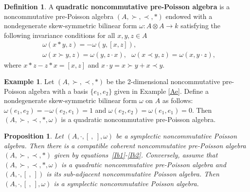 \documentclass[12pt]{amsart}
\newtheorem{pro}[thm]{Proposition}
\theoremstyle{definition}
\newtheorem{defi}[thm]{Definition}
\newtheorem{ex}[thm]{Example}
\begin{document}
\begin{defi} A {\bf quadratic noncommutative pre-Poisson algebra} is a noncommutative pre-Poisson algebra $(A,\succ,\prec, \ast)$
endowed with a nondegenerate 
skew-symmetric bilinear form $\omega:A\otimes A\longrightarrow k$ satisfying the following invariance conditions for all
 $x,y,z\in A $
  \begin{align}&\label{Ib1}
    \omega(x\ast y,z)=-\omega(y,[x,z]),\\&
    \label{Ib2} \omega(x\succ y,z)=\omega(y,z\cdot x) ,\ \ \ 
    \omega(x\prec y,z)=\omega(x,y\cdot z),
  \end{align}
where $x\ast z-z\ast x=[x,z]$ and $x\cdot y=x\succ y+x\prec y$.\end{defi}

\begin{ex} Let $(A,\succ,\prec, \ast)$ be the 2-dimensional noncommutative pre-Poisson algebra with a basis 
$\{ e_1,e_2\}$ given in Example \ref{Ae}.
Define a nondegenerate 
skew-symmetric bilinear form $\omega$ on $A$ as follows:
$\omega(e_1,e_2)=-\omega(e_2,e_1)=1 $ and $\omega(e_2,e_2)=\omega(e_1,e_1)=0 $.
Then $(A,\succ,\prec, \ast,\omega)$ is a quadratic noncommutative pre-Poisson algebra.
\end{ex}

\begin{pro}\label{Ps1} Let  $(A, \cdot, [ \ , \ ],\omega)$ be a symplectic noncommutative Poisson algebra.
Then there is a compatible coherent
noncommutative pre-Poisson algebra $(A,\succ,\prec, \ast)$ given by equations~\eqref{Ib1}-\eqref{Ib2}.
Conversely, assume that $(A, \succ,\prec,\ast,\omega)$ is a quadratic noncommutative pre-Poisson algebra
and $(A, \cdot, [ \ , \ ])$ is
its sub-adjacent noncommutative Poisson algebra. Then $(A, \cdot, [ \ , \ ],\omega)$ is 
a symplectic noncommutative Poisson algebra.\end{pro}
 
\end{document}
